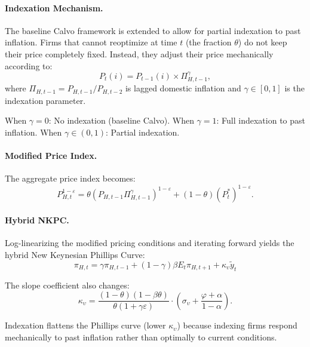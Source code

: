 \documentclass[12pt,a4paper]{article}
\begin{document}
\begin{appendices}
\paragraph{Indexation Mechanism.}
The baseline Calvo framework is extended to allow for partial indexation to past inflation. Firms that cannot reoptimize at time $t$ (the fraction $\theta$) do not keep their price completely fixed. Instead, they adjust their price mechanically according to:
\begin{equation}
	P_t(i) = P_{t-1}(i) \times \Pi_{H,t-1}^\gamma,
	\label{eq:app_indexation_rule}
\end{equation}
where $\Pi_{H,t-1} = P_{H,t-1}/P_{H,t-2}$ is lagged domestic inflation and $\gamma \in [0,1]$ is the indexation parameter.

When $\gamma = 0$: No indexation (baseline Calvo).
When $\gamma = 1$: Full indexation to past inflation.
When $\gamma \in (0,1)$: Partial indexation.

\paragraph{Modified Price Index.}
The aggregate price index becomes:
\begin{equation}
	P_{H,t}^{1-\varepsilon} = \theta (P_{H,t-1}\Pi_{H,t-1}^\gamma)^{1-\varepsilon} + (1-\theta)(P_t^*)^{1-\varepsilon}.
	\label{eq:app_price_index_indexation}
\end{equation}

\paragraph{Hybrid NKPC.}
Log-linearizing the modified pricing conditions and iterating forward yields the hybrid New Keynesian Phillips Curve:
\begin{equation}
	\boxed{\pi_{H,t} = \gamma\pi_{H,t-1} + (1-\gamma)\beta E_t\pi_{H,t+1} + \kappa_\upsilon\tilde{y}_t}
	\label{eq:app_NKPC_hybrid}
\end{equation}

The slope coefficient also changes:
\begin{equation}
	\kappa_\upsilon = \frac{(1-\theta)(1-\beta\theta)}{\theta(1+\gamma\varepsilon)} \cdot (\sigma_\upsilon + \frac{\varphi+\alpha}{1-\alpha}).
	\label{eq:app_kappa_indexation}
\end{equation}

Indexation flattens the Phillips curve (lower $\kappa_\upsilon$) because indexing firms respond mechanically to past inflation rather than optimally to current conditions.


\end{appendices}
\end{document}
